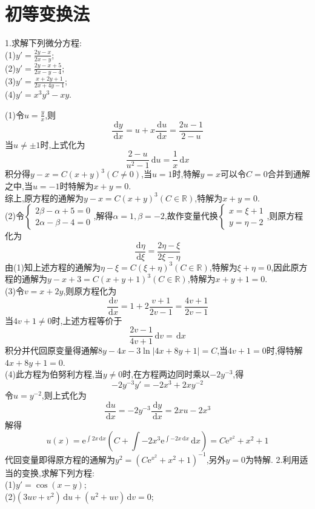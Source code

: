 \documentclass[titlepage,11pt,a4paper,twoside]{report}
\makeatletter
\newcommand\diff{\,\mathrm{d}}
\newcommand\e{\mathrm{e}}
\newenvironment{solve}{\par
	\pushQED{\qed}%
	\normalfont \topsep1\p@\@plus6\p@\relax
	\trivlist
	\item\relax
	{\hspace*{\parindent}{\heiti 解}\@addpunct{:}}\hspace\labelsep\ignorespaces
}{%
	\popQED\endtrivlist\@endpefalse
}
\makeatother
\begin{document}
\section{初等变换法}
1.求解下列微分方程:\\
(1)$\displaystyle y'=\frac{2y-x}{2x-y}$;\\
(2)$\displaystyle y'=\frac{2y-x+5}{2x-y-4}$;\\
(3)$\displaystyle y'=\frac{x+2y+1}{2x+4y-1}$;\\
(4)$\displaystyle y'=x^3y^3-xy$.
\begin{solve}
(1)令$u=\frac{y}{x}$,则\[\frac{\diff y}{\diff x}=u+x\frac{\diff u}{\diff x}=\frac{2u-1}{2-u}\]
当$u\neq\pm1$时,上式化为
\[\frac{2-u}{u^2-1}\diff u=\frac{1}{x}\diff x\]
积分得$y-x=C(x+y)^3(C\neq0)$,当$u=1$时,特解$y=x$可以令$C=0$合并到通解之中,当$u=-1$时特解为$x+y=0$.\\
综上,原方程的通解为$y-x=C(x+y)^3(C\in\mathbb{R})$,特解为$x+y=0$.\\
(2)令$\begin{cases}2\beta-\alpha+5=0\\2\alpha-\beta-4=0\end{cases}$,解得$\alpha=1,\beta=-2$,故作变量代换$\begin{cases}x=\xi+1\\y=\eta-2\end{cases}$,则原方程化为
\[\frac{\diff\eta}{\diff\xi}=\frac{2\eta-\xi}{2\xi-\eta}\]
由(1)知上述方程的通解为$\eta-\xi=C(\xi+\eta)^3(C\in\mathbb{R})$,特解为$\xi+\eta=0$,因此原方程的通解为$y-x+3=C(x+y+1)^3(C\in\mathbb{R})$,特解为$x+y+1=0$.\\
(3)令$v=x+2y$,则原方程化为
\[\frac{\diff v}{\diff x}=1+2\frac{v+1}{2v-1}=\frac{4v+1}{2v-1}\]
当$4v+1\neq0$时,上述方程等价于\[\frac{2v-1}{4v+1}\diff v=\diff x\]
积分并代回原变量得通解$8y-4x-3\ln|4x+8y+1|=C$,当$4v+1=0$时,得特解$4x+8y+1=0$.\\
(4)此方程为伯努利方程,当$y\neq0$时,在方程两边同时乘以$-2y^{-3}$,得
\[-2y^{-3}y'=-2x^3+2xy^{-2}\]
令$u=y^{-2}$,则上式化为
\[\frac{\diff u}{\diff x}=-2y^{-3}\frac{\diff y}{\diff x}=2xu-2x^3\]
解得
\[u(x)=\e^{\int2x\diff x}\left(C+\int-2x^3\e^{\int-2x\diff x}\diff x\right)=C\e^{x^2}+x^2+1\]
代回变量即得原方程的通解为$y^2=\left(C\e^{x^2}+x^2+1\right)^{-1}$,另外$y=0$为特解.
\end{solve}
2.利用适当的变换,求解下列方程:\\
(1)$\displaystyle y'=\cos(x-y)$;\\
(2)$\displaystyle(3uv+v^2)\diff u+(u^2+uv)\diff v=0$;\\
\end{document}
